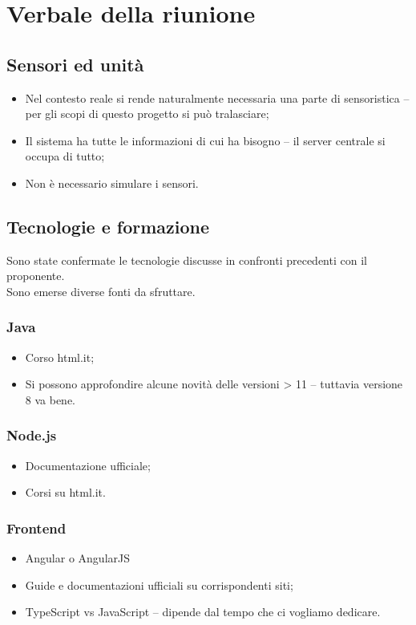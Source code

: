 \section{Verbale della riunione}

\subsection{Sensori ed unità}
\begin{itemize}
    \item Nel contesto reale si rende naturalmente necessaria una parte di sensoristica
    \subitem -- per gli scopi di questo progetto si può tralasciare;
    \item Il sistema ha tutte le informazioni di cui ha bisogno
    \subitem -- il server centrale si occupa di tutto;
    \item Non è necessario simulare i sensori.
\end{itemize}

\subsection{Tecnologie e formazione}
Sono state confermate le tecnologie discusse in confronti precedenti con il proponente.\\Sono emerse diverse fonti da sfruttare.
    \subsubsection{Java}
        \begin{itemize}
            \item Corso html.it;
            \item Si possono approfondire alcune novità delle versioni > 11
                \subitem -- tuttavia versione 8 va bene.
        \end{itemize}

    \subsubsection{Node.js}
        \begin{itemize}
            \item Documentazione ufficiale;
            \item Corsi su html.it.
        \end{itemize}

    \subsubsection{Frontend}
        \begin{itemize}
            \item Angular o AngularJS
            \item Guide e documentazioni ufficiali su corrispondenti siti;
            \item TypeScript vs JavaScript
                \subitem -- dipende dal tempo che ci vogliamo dedicare.
        \end{itemize}

